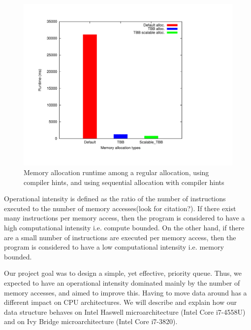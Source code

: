 \begin{figure}
	\centering
  	\includegraphics[scale=0.3]{../plots/mem_alloc/mem_alloc.pdf}
	\caption{Memory allocation runtime among a regular allocation, using compiler hints, and using sequential allocation with compiler hints}
	\label{fig:mem_alloc}
\end{figure}


Operational intensity is defined as the ratio of the number of instructions executed to the number of memory accesses(look for citation?). If there exist many instructions per memory access, then the program is considered to have a high computational intensity i.e. compute bounded. On the other hand, if there are a small number of instructions are executed per memory access, then the program is considered to have a low computational intensity i.e. memory bounded.

Our project goal was to design a simple, yet effective, priority queue. Thus, we expected to have an operational intensity dominated mainly by the number of memory accesses, and aimed to improve this. Having to move data around has a different impact on CPU architectures. We will describe and explain how our data structure behaves on Intel Haswell microarchitecture (Intel Core i7-4558U) and on Ivy Bridge microarchitecture (Intel Core i7-3820). 

